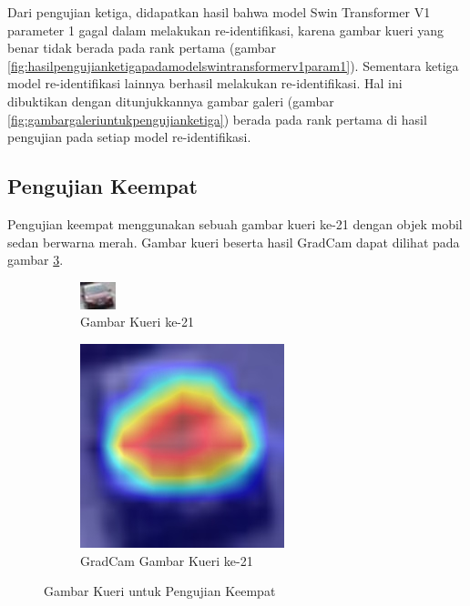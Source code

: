 Dari pengujian ketiga, didapatkan hasil bahwa model Swin Transformer V1 parameter 1 gagal dalam melakukan re-identifikasi, 
karena gambar kueri yang benar tidak berada pada rank pertama (gambar 
\ref{fig:hasilpengujianketigapadamodelswintransformerv1param1}). Sementara ketiga model re-identifikasi lainnya berhasil 
melakukan re-identifikasi. Hal ini dibuktikan dengan ditunjukkannya gambar galeri (gambar \ref{fig:gambargaleriuntukpengujianketiga})
berada pada rank pertama di hasil pengujian pada setiap model re-identifikasi.

\subsection{Pengujian Keempat}

Pengujian keempat menggunakan sebuah gambar kueri ke-21 dengan objek mobil sedan berwarna merah. Gambar kueri 
beserta hasil GradCam dapat dilihat pada gambar \ref{fig:gambarkueriuntukpengujiankeempat}.

\begin{figure}[h!]
  \centering
  \begin{subfigure}{.5\textwidth}
    \centering
    \includegraphics[width=.4\linewidth]{gambar/Que21_1046.jpg}
    \caption{Gambar Kueri ke-21}
    \label{gambarkuerinomorduasatu}
  \end{subfigure}%
  \begin{subfigure}{.5\textwidth}
    \centering
    \includegraphics[width=.4\linewidth]{gambar/GradCamQue21_1046.jpg}
    \caption{GradCam Gambar Kueri ke-21}
    \label{gradcamgambarkuerinomorduasatu}
  \end{subfigure}
  \caption{Gambar Kueri untuk Pengujian Keempat}
  \label{fig:gambarkueriuntukpengujiankeempat}
\end{figure}


